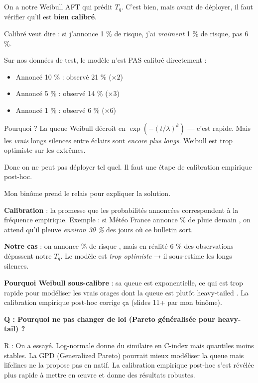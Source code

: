 \documentclass[11pt,a4paper]{article}
\begin{document}
\begin{dire}
\og On a notre Weibull AFT qui prédit $T_q$. C'est bien, mais avant de déployer, il faut
vérifier qu'il est \textbf{bien calibré}.

Calibré veut dire : si j'annonce 1 \% de risque, j'ai \emph{vraiment} 1 \% de risque, pas 6 \%.

Sur nos données de test, le modèle n'est PAS calibré directement :
\begin{itemize}
    \item Annoncé 10 \% : observé 21 \% ($\times 2$)
    \item Annoncé 5 \% : observé 14 \% ($\times 3$)
    \item Annoncé 1 \% : observé 6 \% ($\times 6$)
\end{itemize}

Pourquoi ? La queue Weibull décroît en $\exp(-(t/\lambda)^k)$ — c'est rapide. Mais les
\emph{vrais} longs silences entre éclairs sont \emph{encore plus longs}. Weibull est trop
optimiste sur les extrêmes.

Donc on ne peut pas déployer tel quel. Il faut une étape de calibration empirique post-hoc.

Mon binôme prend le relais pour expliquer la solution. \fg{}
\end{dire}

\begin{compr}
\textbf{Calibration} : la promesse que les probabilités annoncées correspondent à la
fréquence empirique. Exemple : si Météo France annonce  \% de pluie demain \fg{}, on
attend qu'il pleuve \emph{environ 30 \%} des jours où ce bulletin sort.

\textbf{Notre cas} : on annonce  \% de risque \fg{}, mais en réalité 6 \% des
observations dépassent notre $T_q$. Le modèle est \emph{trop optimiste} → il sous-estime
les longs silences.

\textbf{Pourquoi Weibull sous-calibre} : sa queue est exponentielle, ce qui est trop rapide
pour modéliser les vrais orages dont la queue est plutôt \og heavy-tailed \fg{}. La
calibration empirique post-hoc corrige ça (slides 11+ par mon binôme).
\end{compr}

\begin{piege}
\textbf{Q : Pourquoi ne pas changer de loi (Pareto généralisée pour heavy-tail) ?}

R : On a essayé. Log-normale donne du similaire en C-index mais quantiles moins stables.
La GPD (Generalized Pareto) pourrait mieux modéliser la queue mais lifelines ne la propose
pas en natif. La calibration empirique post-hoc s'est révélée plus rapide à mettre en œuvre
et donne des résultats robustes.
\end{piege}
\end{document}
